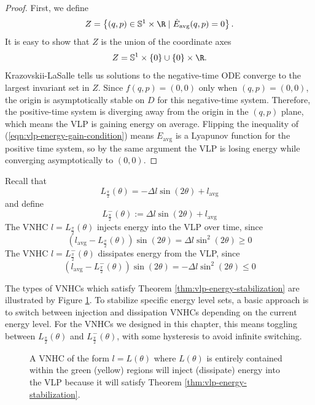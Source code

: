 \begin{proof}
   First, we define 
   \[
      Z = \left\{(q,p) \in \mathbb{S}^1\times \R \mid 
      \dot{E}_\text{avg}(q,p) = 0 \right\}
      .
   \]
   It is easy to show that \(Z\) is the union of the coordinate axes
   \[
      Z= \mathbb{S}^1 \times \left\{0\right\} \cup 
         \left\{0\right\} \times \R
      .
   \]
   Krazovskii-LaSalle tells us solutions to the negative-time ODE converge to
   the largest invariant set in \(Z\).
   Since \(f(q,p) = (0,0)\) only when \((q,p) = (0,0)\),
   the origin is asymptotically stable on \(D\) for this negative-time system.
   Therefore, the positive-time system is diverging away from the origin 
   in the \((q,p)\) plane, which means the VLP is gaining energy on average.
   Flipping the inequality of (\ref{eqn:vlp-energy-gain-condition}) 
   means \(E_\text{avg}\) is a Lyapunov function for the positive time system,
   so by the same argument the VLP is losing energy while converging
   asymptotically to \((0,0)\).
 \end{proof}

\begin{cor}
   Recall that
   \[
      L_\frac{\pi}{2}(\theta) = -\Delta l \sin(2\theta) + l_\text{avg}
   \]
   and define 
   \[
      L^{-}_\frac{\pi}{2}(\theta) := \Delta l \sin(2\theta) + l_\text{avg}
   \]
   The VNHC \(l = L_\frac{\pi}{2}(\theta)\) injects energy into the VLP
   over time, since 
   \[
      \left(l_\text{avg} - L_\frac{\pi}{2}(\theta)\right)\sin(2\theta) = 
      \Delta l \sin^2(2\theta) \geq 0
   \] 
   The VNHC \(l = L^{-}_\frac{\pi}{2}(\theta)\) dissipates energy
   from the VLP, since 
   \[
      \left(l_\text{avg} - L^{-}_\frac{\pi}{2}(\theta)\right)\sin(2\theta) = 
      - \Delta l \sin^2(2\theta) \leq 0
   \] 
\end{cor}

The types of VNHCs which satisfy Theorem \ref{thm:vlp-energy-stabilization} are
illustrated by Figure \ref{fig:vlp-energy-in-out}. 
To stabilize specific energy level sets, a basic approach is to switch
between injection and dissipation VNHCs depending on the current energy level.
For the VNHCs we designed in this chapter, this means toggling
between \(L_\frac{\pi}{2}(\theta)\) and \(L^{-}_\frac{\pi}{2}(\theta)\),
with some hysteresis to avoid infinite switching.  

\begin{figure}
   \centering
   
   \caption{A VNHC of the form \(l = L(\theta)\) where \(L(\theta)\)
      is entirely contained within
      the green (yellow) regions will inject (dissipate) energy into the VLP
      because it will satisfy Theorem \ref{thm:vlp-energy-stabilization}.}
      \label{fig:vlp-energy-in-out}
\end{figure}

